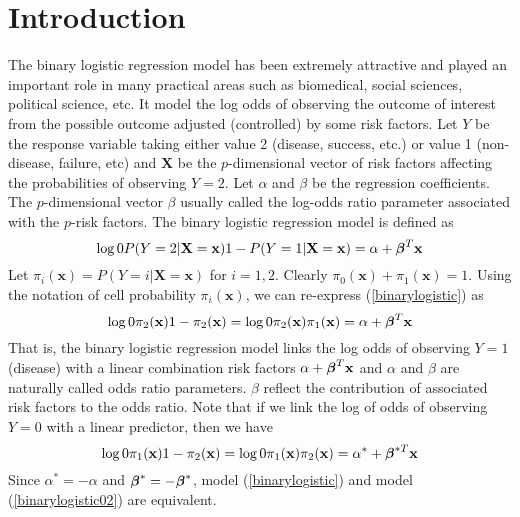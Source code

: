 \documentclass[11pt]{article}
\theoremstyle{plain}
\theoremstyle{definition}
\theoremstyle{remark}
\theoremstyle{definition}
\begin{document}
\section{Introduction}
\label{sec:1} The binary logistic regression model has been extremely
attractive and played an important role in many practical areas such
as biomedical, social sciences, political science, etc. It model the
log odds of observing the outcome of interest from the possible outcome
adjusted (controlled) by some risk factors. Let $Y$ be the response
variable taking either value 2 (disease, success, etc.) or value 1
(non-disease, failure, etc) and ${\mathbf{X}}$ be the $p$-dimensional vector
of risk factors affecting the probabilities of observing $Y=2$. Let $\alpha$
and {\boldmath $\beta$} be the regression coefficients. The $p$-dimensional vector
{\boldmath $\beta$} usually called the log-odds ratio parameter associated with
the $p$-risk factors. The binary logistic regression model is defined as
\begin{equation}
\log \frac{P(Y=2|\mathbf{X} = \mathbf{x})}{1-P(Y=1|\mathbf{X} = \mathbf{x})}
=\alpha + {\mbox{\boldmath $\beta$}}^T\mathbf{x}\label{binarylogistic}
\end{equation}
Let $\pi_i(\mathbf{x})= P(Y=i |\mathbf{X}=\mathbf{x})$ for $i=1,2$. Clearly
$\pi_0(\mathbf{x})+\pi_1(\mathbf{x})=1$. Using the notation of cell probability
$\pi_i(\mathbf{x})$, we can re-express (\ref{binarylogistic}) as
\begin{equation}
\log \frac{\pi_2(\mathbf{x})}{1-\pi_2(\mathbf{x})}=
\log \frac{\pi_2(\mathbf{x})}{\pi_1(\mathbf{x})}=\alpha +  {\mbox{\boldmath $\beta$}}^T\mathbf{x}
\end{equation}
That is, the binary logistic regression model links the log odds of observing $Y=1$ (disease) with
a linear combination risk factors $\alpha +  {\mbox{\boldmath $\beta$}}^T\mathbf{x}$ and $\alpha$ and
{\boldmath $\beta$} are naturally called odds ratio parameters. {\boldmath $\beta$} reflect the contribution
of associated risk factors to the odds ratio. Note that if we link the log of odds of observing $Y=0$ with a linear predictor, then we have
\begin{equation}
\log \frac{\pi_1(\mathbf{x})}{1-\pi_2(\mathbf{x})}=
\log \frac{\pi_1(\mathbf{x})}{\pi_2(\mathbf{x})}=\alpha^* +  {\mbox{\boldmath $\beta$}}^{*T}\mathbf{x} \label{binarylogistic02}
\end{equation}
Since $\alpha^*=-\alpha$ and ${\mbox{\boldmath $\beta$}}^* = - {\mbox{\boldmath $\beta$}}^{*}$, model (\ref{binarylogistic}) and model (\ref{binarylogistic02}) are equivalent.
\end{document}
